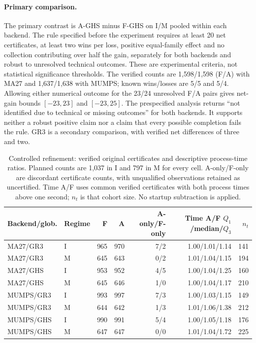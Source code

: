 \documentclass[pdflatex,sn-mathphys-num]{sn-jnl}
\theoremstyle{thmstyleone}
\theoremstyle{thmstylethree}
\begin{document}
\paragraph{Primary comparison.}
The primary contrast is A-GHS minus F-GHS on I/M pooled within each
backend. The rule specified before the experiment requires at least 20 net
certificates, at least two wins per loss, positive equal-family effect
and no collection contributing over half the gain, separately for both
backends and robust to unresolved technical outcomes. These are
experimental criteria, not statistical significance thresholds. The verified counts
are 1,598/1,598 (F/A) with MA27 and 1,637/1,638 with MUMPS; known wins/losses
are 5/5 and 5/4. Allowing either numerical outcome for the 23/24 unresolved
F/A pairs gives net-gain bounds $[-23,23]$ and $[-23,25]$.
The prespecified analysis returns ``not identified due to technical
or missing outcomes'' for both backends. It supports neither a robust
positive claim nor a claim that every possible completion fails the rule.
GR3 is a secondary comparison, with verified net differences of three and two.

\begin{table}[!htbp]
\centering\footnotesize\setlength{\tabcolsep}{3pt}
\caption{Controlled refinement: verified original certificates and descriptive
process-time ratios. Planned counts are 1,037 in I and 797 in M for every
cell. A-only/F-only are discordant certificate counts, with unqualified
observations retained as uncertified. Time A/F uses common verified
certificates with both process times above one second; $n_t$ is that
cohort size. No startup subtraction is applied.}
\label{tab:controlled-refinement-coverage}
\begin{tabular}{@{}llrrrrr@{}}
\toprule
Backend/glob. & Regime & F & A & A-only/F-only & \shortstack{Time A/F\\$Q_1$/median/$Q_3$} & $n_t$\\
\midrule
MA27/GR3 & I & 965 & 970 & 7/2 & 1.00/1.01/1.14 & 141\\
MA27/GR3 & M & 645 & 643 & 0/2 & 1.01/1.04/1.15 & 194\\
MA27/GHS & I & 953 & 952 & 4/5 & 1.00/1.04/1.25 & 160\\
MA27/GHS & M & 645 & 646 & 1/0 & 1.00/1.04/1.17 & 210\\
MUMPS/GR3 & I & 993 & 997 & 7/3 & 1.00/1.03/1.15 & 149\\
MUMPS/GR3 & M & 644 & 642 & 1/3 & 1.01/1.06/1.38 & 212\\
MUMPS/GHS & I & 990 & 991 & 5/4 & 1.00/1.05/1.18 & 176\\
MUMPS/GHS & M & 647 & 647 & 0/0 & 1.01/1.04/1.72 & 225\\
\bottomrule
\end{tabular}

\end{table}
\end{document}
